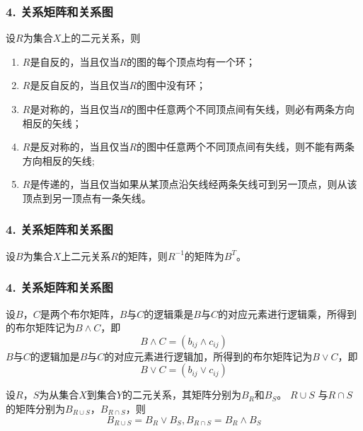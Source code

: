 \documentclass{beamer}
\begin{document}
\begin{CJK*}{UTF8}{gbsn}
\begin{frame}
  \frametitle{4. 关系矩阵和关系图}
  \begin{Thm}
  设$R$为集合$X$上的二元关系，则
  \begin{enumerate}[(1)]
  \item $R$是自反的，当且仅当$R$的图的每个顶点均有一个环；
  \item $R$是反自反的，当且仅当$R$的图中没有环；
  \item $R$是对称的，当且仅当$R$的图中任意两个不同顶点间有矢线，则必有两条方向相反的矢线；
  \item $R$是反对称的，当且仅当$R$的图中任意两个不同顶点间有失线，则不能有两条方向相反的矢线;
  \item $R$是传递的，当且仅当如果从某顶点沿矢线经两条矢线可到另一顶点，则从该顶点到另一顶点有一条矢线。
  \end{enumerate}
\end{Thm}
\end{frame}
\begin{frame}
  \frametitle{4. 关系矩阵和关系图}
  \begin{Thm}
    设$B$为集合$X$上二元关系$R$的矩阵，则$R^{-1}$的矩阵为$B^{T}$。
  \end{Thm}
\end{frame}

\begin{frame}
  \frametitle{4. 关系矩阵和关系图}
  \begin{Def}
    设$B$，$C$是两个布尔矩阵，$B$与$C$的逻辑乘是$B$与$C$的对应元素进行逻辑乘，所得到的布尔矩阵记为$B \land C$，即
    \begin{equation*}
      B \land C = (b_{ij} \land c_{ij})
    \end{equation*}
    $B$与$C$的逻辑加是$B$与$C$的对应元素进行逻辑加，所得到的布尔矩阵记为$B \lor C$，即
    \begin{equation*}
      B \lor C = (b_{ij} \lor c_{ij})
    \end{equation*}
  \end{Def}
  \begin{Thm}
    设$R$，$S$为从集合$X$到集合$Y$的二元关系，其矩阵分别为$B_R$和$B_S$。 $R\cup S$ 与$R \cap S$的矩阵分别为$B_{R\cup S}$，$B_{R\cap S}$，则
    \begin{equation*}
      B_{R\cup S}=B_R \lor B_S, B_{R\cap S}=B_R \land B_S
    \end{equation*}
  \end{Thm}
\end{frame}


\end{CJK*}
\end{document}
